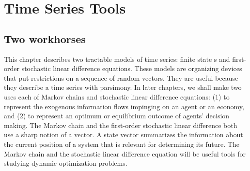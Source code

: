 %
%


\chapter{Time Series Tools\label{timeseries}}
\def\toone{{t+1}}
\def\ttwo{{t+2}}
\def\tthree{{t+3}}
\def\Tone{{T+1}}
\def\TTT{{T-1}}
\def\rtr{{\rm tr}}
\def\epigraph#1#2{%
\begingroup
\smallskip
\leftskip=2em
\rightskip=0pt plus2em
\it\noindent #1\par
\noindent --- #2\par
\endgroup\noindent}
%
\def\frac#1#2{#1\over #2}
%

\section{Two workhorses}
  This chapter describes two tractable models
of time series: finite state s and   first-order
stochastic linear difference equations.   These models are
organizing devices that  put    restrictions on a
sequence of random vectors.  They are useful because they describe
a time series  with parsimony. In later chapters, we shall  make
two uses each of Markov chains and stochastic linear difference
equations: (1) to represent the exogenous information flows
impinging on an agent or an economy, and (2) to represent an
optimum or equilibrium outcome of agents' decision making.
The Markov chain and the first-order stochastic linear difference
both use a sharp  notion of a  vector.  A state vector
summarizes the information about the current position of a system that
is relevant for determining its future.
The Markov chain and the stochastic linear difference equation
will   be useful tools   for studying dynamic optimization
problems.
